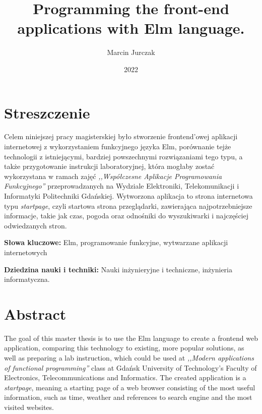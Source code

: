 \documentclass[twoside,a4paper]{report}
\begin{document}


\title{Programming the front-end applications with Elm language.}
\author{Marcin Jurczak}
\date{2022}

\maketitle


\chapter*{Streszczenie}
\noindent
Celem niniejszej pracy magisterskiej było stworzenie frontend'owej aplikacji internetowej z wykorzystaniem funkcyjnego języka Elm, porównanie tejże technologii z istniejącymi, bardziej powszechnymi rozwiązaniami tego typu, a także przygotowanie instrukcji laboratoryjnej, która mogłaby zostać wykorzystana w ramach zajęć \textit{,,Współczesne Aplikacje Programowania Funkcyjnego''} przeprowadzanych na Wydziale Elektroniki, Telekomunikacji i Informatyki Politechniki Gdańskiej. Wytworzona aplikacja to strona internetowa typu \textit{startpage}, czyli startowa strona przeglądarki, zawierająca najpotrzebniejsze informacje, takie jak czas, pogoda oraz odnośniki do wyszukiwarki i najczęściej odwiedzanych stron.

\textbf{Słowa kluczowe:} Elm, programowanie funkcyjne, wytwarzane aplikacji internetowych

\textbf{Dziedzina nauki i techniki: }Nauki inżynieryjne i techniczne, inżynieria informatyczna.

{\let\clearpage\relax\chapter*{Abstract}}
\noindent
The goal of this master thesis is to use the Elm language to create a frontend web application, comparing this technology to existing, more popular solutions, as well as preparing a lab instruction, which could be used at \textit{,,Modern applications of functional programming''} class at Gdańsk University of Technology’s Faculty of Electronics, Telecommunications and Informatics. The created application is a \textit{startpage}, meaning a starting page of a web browser consisting of the most useful information, such as time, weather and references to search engine and the most visited websites.
\end{document}
